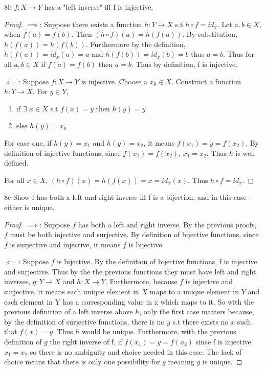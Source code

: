 \documentclass{article}
\newcommand{\rarr}[0]{\rightarrow}
\begin{document}
\begin{claim}{8b}
	$ f: X \rarr Y $ has a "left inverse" iff f is injective.
\end{claim}
\begin{proof}
	$\implies$: Suppose there exists a function $h: Y \rarr X$ s.t $h \circ f = id_x$. Let $a, b \in X$, when $f(a) = f(b)$. Then $(h \circ f)(a) = h(f(a))$. By substitution, $h(f(a)) = h(f(b))$. Furthermore by the definition, $h(f(a)) = id_x(a) = a$ and $h(f(b)) = id_x(b) = b$ thus $a = b$. Thus for all $a, b \in X$ if $f(a) = f(b)$ then $a = b$. Thus by definition, f is injective.

	$\impliedby$: Suppose $f: X \rarr Y$ is injective. Choose a $x_0 \in X$. Construct a function $h : Y \rarr X$. For $y \in Y$,

	\begin{enumerate}
		\item if $\exists$ $x \in X$ s.t $f(x) = y$ then $h(y) = y$
		\item else $h(y) = x_0$
	\end{enumerate}

	For case one, if $h(y) = x_1$ and $h(y) = x_2$, it means $f(x_1) = y = f(x_2)$. By definition of injective functions, since $f(x_1) = f(x_2)$, $x_1 = x_2$. Thus $h$ is well defined.

	For all $x \in X$, $(h \circ f)(x) = h(f(x)) = x = id_x(x)$. Thus $h \circ f = id_x$.
\end{proof}
\begin{claim}{8c}
	Show f has both a left and right inverse iff f is a bijection, and in this case either is unique.
\end{claim}
\begin{proof}
	$\implies$: Suppose $f$ has both a left and right inverse. By the previous proofs, $f$ must be both injective and surjective. By definition of bijective functions, since $f$ is surjective and injective, it means $f$ is bijective.

	$\impliedby$: Suppose $f$ is bijective. By the definition of bijective functions, f is injective and surjective. Thus by the the previous functions they must have left and right inverses, $g: Y \rarr X$ and $h: X \rarr Y$. Furthermore, because $f$ is injective and surjective, it means each unique element in $X$ maps to a unique element in $Y$ and each element in Y has a corresponding value in x which maps to it. So with the previous definition of a left inverse above $h$, only the first case matters because, by the definition of surjective functions, there is no $y$ s.t there exists no $x$ such that $f(x) = y$. Thus $h$ would be unique. Furthermore, with the previous definition of $g$ the right inverse of f, if $f(x_1) = y = f(x_2)$ since f is injective $x_1 = x_2$ so there is no ambiguity and choice needed in this case. The lack of choice means that there is only one possibility for $g$ meaning $g$ is unique. 
\end{proof}
\end{document}
